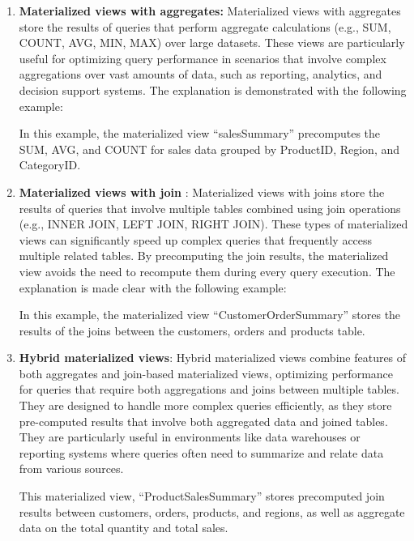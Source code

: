 \vspace{.4cm}

\begin{enumerate}[label=\alph*)]
 \item\textbf{ Materialized views with aggregates:} Materialized views with aggregates store the results of queries that perform aggregate calculations (e.g., SUM, COUNT, AVG, MIN, MAX) over large datasets. These views are particularly useful for optimizing query performance in scenarios that involve complex aggregations over vast amounts of data, such as reporting, analytics, and decision support systems. The explanation is demonstrated with the following example:\vspace{.4cm}
    
    

    In this example, the materialized view ``salesSummary'' precomputes the SUM, AVG, and COUNT for sales data grouped by ProductID, Region, and CategoryID.

    \item\textbf{Materialized views with join }: Materialized views with joins store the results of queries that involve multiple tables combined using join operations (e.g., INNER JOIN, LEFT JOIN, RIGHT JOIN). These types of materialized views can significantly speed up complex queries that frequently access multiple related tables. By precomputing the join results, the materialized view avoids the need to recompute them during every query execution. The explanation is made clear with the following example: \vspace{.4cm}
    
    

    In this example, the materialized view ``CustomerOrderSummary''
    stores the results of the joins between the customers, orders and products table.
    
    \item \textbf{Hybrid materialized views}: Hybrid materialized views combine features of both aggregates and join-based materialized views, optimizing performance for queries that require both aggregations and joins between multiple tables. They are designed to handle more complex queries efficiently, as they store pre-computed results that involve both aggregated data and joined tables. They are particularly useful in environments like data warehouses or reporting systems where queries often need to summarize and relate data from various sources. \vspace{.4cm}
    
     
    
This materialized view, ``ProductSalesSummary'' stores precomputed join results between customers, orders, products, and regions, as well as aggregate data on the total quantity and total sales.
    
\end{enumerate}

